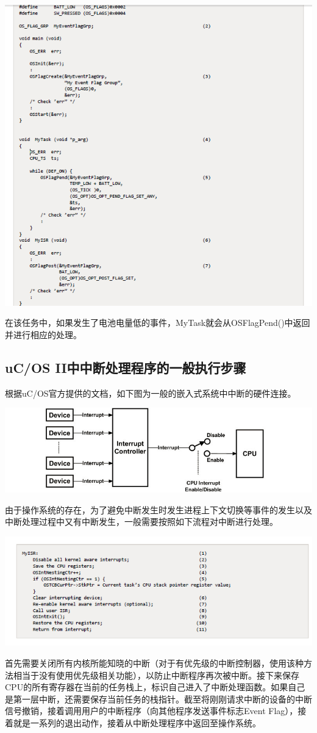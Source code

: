 \documentclass{ctexart}
\begin{document}
\centerline{\includegraphics[scale=0.8]{009}}\par
在该任务中，如果发生了电池电量低的事件，MyTask就会从OSFlagPend()中返回并进行相应的处理。
\subsection{uC/OS II中中断处理程序的一般执行步骤}
 根据uC/OS官方提供的文档\cite{Manual}，如下图为一般的嵌入式系统中中断的硬件连接。
 
\centerline{\includegraphics[scale=0.7]{010}}\par
   由于操作系统的存在，为了避免中断发生时发生进程上下文切换等事件的发生以及中断处理过程中又有中断发生，一般需要按照如下流程对中断进行处理。
   
\centerline{\includegraphics[scale=0.8]{011}}\par
首先需要关闭所有内核所能知晓的中断（对于有优先级的中断控制器，使用该种方法相当于没有使用优先级相关功能），以防止中断程序再次被中断。接下来保存CPU的所有寄存器在当前的任务栈上，标识自己进入了中断处理函数。如果自己是第一层中断，还需要保存当前任务的栈指针。截至将刚刚请求中断的设备的中断信号撤销，接着调用用户的中断程序（向其他程序发送事件标志Event Flag），接着就是一系列的退出动作，接着从中断处理程序中返回至操作系统。
\end{document}
